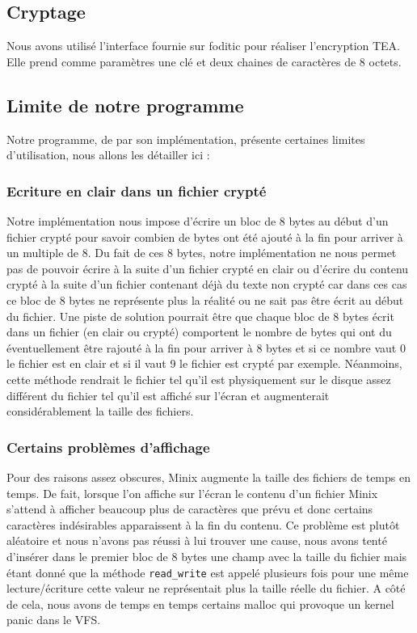 \documentclass[10pt, onecolumn] {IEEEtran}
\begin{document}
\subsection{Cryptage}

Nous avons utilisé l'interface fournie sur foditic pour réaliser l'encryption TEA. Elle prend comme paramètres une clé et deux chaines de caractères de 8 octets.

\subsection{Limite de notre programme}

Notre programme, de par son implémentation, présente certaines limites d'utilisation, nous allons les détailler ici :
\subsubsection{Ecriture en clair dans un fichier crypté}

Notre implémentation nous impose d'écrire un bloc de 8 bytes au début d'un fichier crypté pour savoir combien de bytes ont été ajouté à la fin pour arriver à un multiple de 8. Du fait de ces 8 bytes, notre implémentation ne nous permet pas de pouvoir écrire à la suite d'un fichier crypté en clair ou d'écrire du contenu crypté à la suite d'un fichier contenant déjà du texte non crypté car dans ces cas ce bloc de 8 bytes ne représente plus la réalité ou ne sait pas être écrit au début du fichier.
Une piste de solution pourrait être que chaque bloc de 8 bytes écrit dans un fichier (en clair ou crypté) comportent le nombre de bytes qui ont du éventuellement être rajouté à la fin pour arriver à 8 bytes et si ce nombre vaut 0 le fichier est en clair et si il vaut 9 le fichier est crypté par exemple. Néanmoins, cette méthode rendrait le fichier tel qu'il est physiquement sur le disque assez différent du fichier tel qu'il est affiché sur l'écran et augmenterait considérablement la taille des fichiers.
\subsubsection{Certains problèmes d'affichage}

Pour des raisons assez obscures, Minix augmente la taille des fichiers de temps en temps. De fait, lorsque l'on affiche sur l'écran le contenu d'un fichier Minix s'attend à afficher beaucoup plus de caractères que prévu et donc certains caractères indésirables apparaissent à la fin du contenu. Ce problème est plutôt aléatoire et nous n'avons pas réussi à lui trouver une cause, nous avons tenté d'insérer dans le premier bloc de 8 bytes une champ avec la taille du fichier mais étant donné que la méthode \texttt{read\_write} est appelé plusieurs fois pour une même lecture/écriture cette valeur ne représentait plus la taille réelle du fichier.
A côté de cela, nous avons de temps en temps certains malloc qui provoque un kernel panic dans le VFS.
\end{document}
